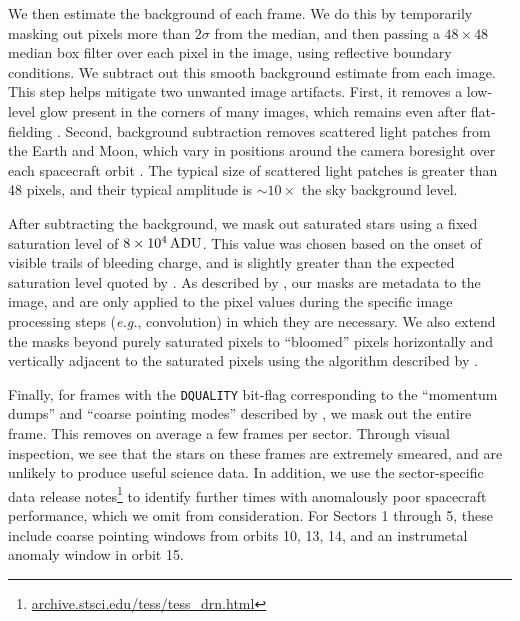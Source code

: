 \documentclass[12pt,twocolumn,tighten]{aastex62}
\begin{document}
We then estimate the background of each frame.  We do this by
temporarily masking out pixels more than $2\sigma$ from the median,
and then passing a $48\times48$ median box filter over each pixel in
the image, using reflective boundary conditions. We subtract out this
smooth background estimate from each image.  This step helps mitigate
two unwanted image artifacts.  First, it removes a low-level glow
present in the corners of many images, which remains even after
flat-fielding \citep[see][\S 7.3.5]{vanderspek_2018}.  Second,
background subtraction removes scattered light patches from the Earth
and Moon, which vary in positions around the camera boresight over
each spacecraft orbit \citep[see][\S 7.3.1--7.3.4]{vanderspek_2018}.
The typical size of scattered light patches is greater than 48 pixels,
and their typical amplitude is $\sim 10\times$ the sky background
level. 


After subtracting the background, we mask out saturated stars using a
fixed saturation level of $8\times10^4\,{\rm ADU}$. This value was
chosen based on the onset of visible trails of bleeding charge, and is
slightly greater than the expected saturation level quoted by
\citet{vanderspek_2018}.  As described by \citet{Pal_2009}, our masks
are metadata to the image, and are only applied to the
pixel values during the specific image processing steps ({\it e.g.},
convolution) in which they are necessary. We also extend the masks
beyond purely saturated pixels to ``bloomed'' pixels horizontally and
vertically adjacent to the saturated pixels using the algorithm
described by \citet{Pal_2009}.

Finally, for frames with the \texttt{DQUALITY} bit-flag corresponding
to the ``momentum dumps'' and ``coarse pointing modes'' described by
\citet{vanderspek_2018}, we mask out the entire frame.  This removes
on average a few frames per sector. Through visual inspection, we see
that the stars on these frames are extremely smeared, and are unlikely
to produce useful science data.
In addition, we use the sector-specific data release
notes\footnote{\url{ archive.stsci.edu/tess/tess_drn.html}} to
identify further  times with anomalously poor spacecraft performance,
which we omit from consideration. For Sectors 1 through 5, these
include coarse pointing windows from orbits 10, 13, 14, and an
instrumetal anomaly window in orbit 15.
\end{document}
